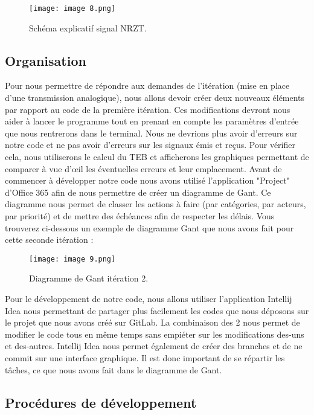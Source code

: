 \begin{figure}[H]
    \centering
    \texttt{[image: image 8.png]}
    \caption{\label{fig:image8}Schéma explicatif signal NRZT.}
\end{figure}

\subsection{Organisation}

Pour nous permettre de répondre aux demandes de l'itération (mise en place d'une transmission analogique), nous allons devoir créer deux nouveaux éléments par rapport au code de la première itération. Ces modifications devront nous aider à lancer le programme tout en prenant en compte les paramètres d'entrée que nous rentrerons dans le terminal.
Nous ne devrions plus avoir d'erreurs sur notre code et ne pas avoir d'erreurs sur les signaux émis et reçus. Pour vérifier cela, nous utiliserons le calcul du TEB et afficherons les graphiques permettant de comparer à vue d'œil les éventuelles erreurs et leur emplacement.
Avant de commencer à développer notre code nous avons utilisé l'application "Project" d'Office 365 afin de nous permettre de créer un diagramme de Gant. Ce diagramme nous permet de classer les actions à faire (par catégories, par acteurs, par priorité) et de mettre des échéances afin de respecter les délais. Vous trouverez ci-dessous un exemple de diagramme Gant que nous avons fait pour cette seconde itération :

\begin{figure}[H]
    \centering
    \texttt{[image: image 9.png]}
    \caption{\label{fig:image9}Diagramme de Gant itération 2.}
\end{figure}

Pour le développement de notre code, nous allons utiliser l'application Intellij Idea nous permettant de partager plus facilement les codes que nous déposons sur le projet que nous avons créé sur GitLab. La combinaison des 2 nous permet de modifier le code tous en même temps sans empiéter sur les modifications des-uns et des-autres. Intellij Idea nous permet également de créer des branches et de ne commit sur une interface graphique. Il est donc important de se répartir les tâches, ce que nous avons fait dans le diagramme de Gant.

\subsection{Procédures de développement}
